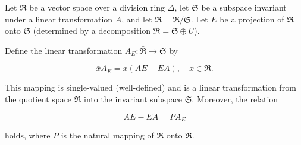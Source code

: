 Let $\Re$ be a vector space over a division ring $\Delta$, let $\mathfrak{S}$ be a subspace invariant under a linear transformation $A$, and let $\bar{\Re} = \Re / \mathfrak{S}$. Let $E$ be a projection of $\Re$ onto $\mathfrak{S}$ (determined by a decomposition $\Re = \mathfrak{S} \oplus U$).

Define the linear transformation $A_E : \bar{\Re} \to \mathfrak{S}$ by

$$\bar{x} A_E = x(AE - EA), \quad x \in \Re.$$

This mapping is single-valued (well-defined) and is a linear transformation from the quotient space $\bar{\Re}$ into the invariant subspace $\mathfrak{S}$. Moreover, the relation

$$AE - EA = P A_E$$

holds, where $P$ is the natural mapping of $\Re$ onto $\bar{\Re}$.
